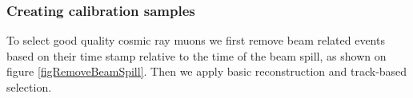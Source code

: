 \documentclass[12pt,a4paper]{article}
\begin{document}


\subsubsection*{Creating calibration samples}

To select good quality cosmic ray muons we first remove beam related events based on their time stamp relative to the time of the beam spill, as shown on figure \ref{figRemoveBeamSpill}. Then we apply basic reconstruction and track-based selection.
\end{document}
